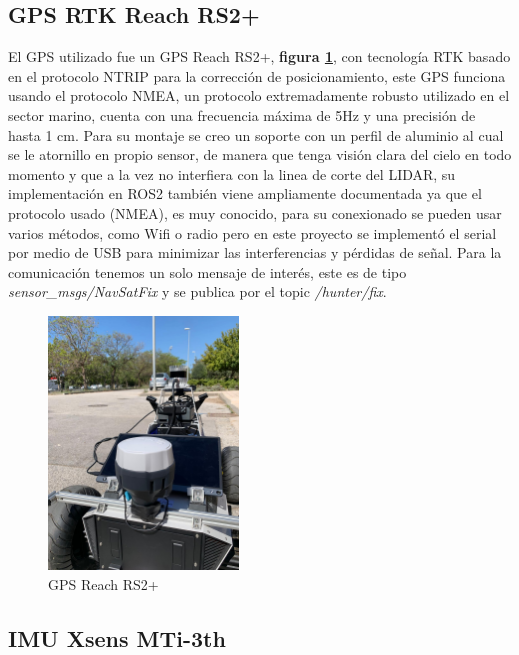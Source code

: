 \subsection{GPS RTK Reach RS2+}

El GPS utilizado fue un GPS Reach RS2+, \textbf{figura \ref{fig:reach_rs2}}, con tecnología RTK basado en el protocolo NTRIP para la 
corrección de posicionamiento, este GPS funciona usando el protocolo NMEA, un protocolo extremadamente robusto utilizado en el sector marino, 
cuenta con una frecuencia máxima de 5Hz y una precisión de hasta 1 cm. Para su montaje se creo un soporte con un perfil de aluminio al cual 
se le atornillo en propio sensor, de manera que tenga visión clara del cielo en todo momento y que a la vez no interfiera con la linea de 
corte del LIDAR, su implementación en ROS2 también viene ampliamente documentada ya que el protocolo usado (NMEA), es muy conocido, 
para su conexionado se pueden usar varios métodos, como Wifi o radio pero en este proyecto se implementó el serial por medio de USB para 
minimizar las interferencias y pérdidas de señal. Para la comunicación tenemos un solo mensaje de interés, este es de tipo \textit{sensor\_msgs/NavSatFix} 
y se publica por el topic \textit{/hunter/fix}.

\begin{figure}[h]
    \centering
    \includegraphics[width=0.45\textwidth]{images/reach_rs2.jpeg}
    \caption{GPS Reach RS2+}
    \label{fig:reach_rs2}
\end{figure}

\subsection{IMU Xsens MTi-3th}

